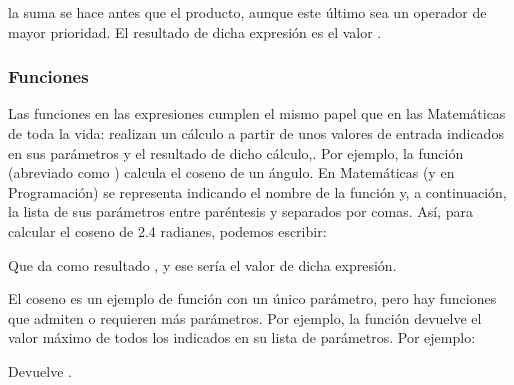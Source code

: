 \documentclass[a4paper,12pt,spanish]{sphinxmanual}
\begin{document}
\begin{sphinxVerbatim}[commandchars=\\\{\}]
    
\end{sphinxVerbatim}

la suma se hace antes que el producto, aunque este último sea un operador de
mayor prioridad. El resultado de dicha expresión es el valor .

\ignorespaces 

\subsubsection{Funciones}
\label{\detokenize{php:funciones}}\label{\detokenize{php:index-10}}
Las funciones en las expresiones cumplen el mismo papel que en las Matemáticas
de toda la vida: realizan un cálculo a partir de unos valores de entrada
indicados en sus parámetros y  el resultado de dicho cálculo,. Por
ejemplo, la función  (abreviado como ) calcula el coseno de un
ángulo. En Matemáticas (y en Programación) se representa indicando el nombre de
la función y, a continuación, la lista de sus parámetros entre paréntesis y
separados por comas. Así, para calcular el coseno de 2.4 radianes, podemos
escribir:

\begin{sphinxVerbatim}[commandchars=\\\{\}]
\end{sphinxVerbatim}

Que da como resultado , y ese sería el valor de dicha
expresión.

El coseno es un ejemplo de función con un único parámetro, pero hay funciones
que admiten o requieren más parámetros. Por ejemplo, la función 
devuelve el valor máximo de todos los indicados en su lista de parámetros. Por
ejemplo:

\begin{sphinxVerbatim}[commandchars=\\\{\}]
   
\end{sphinxVerbatim}

Devuelve .
\end{document}
